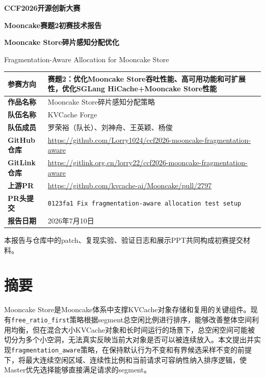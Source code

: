 \documentclass[UTF8,zihao=-4,a4paper]{ctexart}
\renewcommand{\arraystretch}{1.34}
\newcommand{\artifact}[1]{\texttt{#1}}
\newcommand{\strategy}{\texttt{fragmentation\_aware}}
\newcommand{\baseline}{\texttt{free\_ratio\_first}}
\begin{document}
\begin{titlepage}
  \centering
  \vspace*{1.1cm}
  {\sffamily\bfseries{}\color{black}CCF2026开源创新大赛\par}
  \vspace{0.35cm}
  {\sffamily\bfseries{}\color{black}Mooncake赛题2初赛技术报告\par}
  \vspace{1.2cm}
  {\bfseries{}Mooncake Store碎片感知分配优化\par}
  \vspace{0.55cm}
  {\Large Fragmentation-Aware Allocation for Mooncake Store\par}
  \vspace{1.2cm}
  {\small
  \renewcommand{\arraystretch}{1.08}
  \begin{tabular}{|>{\sffamily\bfseries\centering\arraybackslash}p{3.2cm}|>{\raggedright\arraybackslash}p{9.3cm}|}
    \hline
    参赛方向 & 赛题2：优化Mooncake Store吞吐性能、高可用功能和可扩展性，优化SGLang HiCache+Mooncake Store性能 \\ \hline
    作品名称 & Mooncake Store碎片感知分配策略 \\ \hline
    队伍名称 & KVCache Forge \\ \hline
    队伍成员 & 罗荣裕（队长）、刘神舟、王英颖、杨俊 \\ \hline
    GitHub仓库 & \url{https://github.com/Lorry1024/ccf2026-mooncake-fragmentation-aware} \\ \hline
    GitLink仓库 & \url{https://gitlink.org.cn/lorry22/ccf2026-mooncake-fragmentation-aware} \\ \hline
    上游PR & \url{https://github.com/kvcache-ai/Mooncake/pull/2797} \\ \hline
    PR头提交 & \artifact{0123fa1 Fix fragmentation-aware allocation test setup} \\ \hline
    报告日期 & 2026年7月10日 \\ \hline
  \end{tabular}
  }
  \vfill
  {\small 本报告与仓库中的patch、复现实验、验证日志和展示PPT共同构成初赛提交材料。\par}
\end{titlepage}

\section*{摘要}

Mooncake Store是Mooncake体系中支撑KVCache对象存储和复用的关键组件。现有\baseline{}策略根据segment总空闲比例进行排序，能够改善整体空间利用均衡，但在混合大小KVCache对象和长时间运行的场景下，总空闲空间可能被切分为多个小空洞，无法真实反映当前大对象是否可以被连续放入。本文提出并实现\strategy{}策略，在保持默认行为不变和有界候选采样不变的前提下，将最大连续空闲区域、连续性比例和当前请求可容纳性纳入排序逻辑，使Master优先选择能够直接满足请求的segment。
\end{document}
